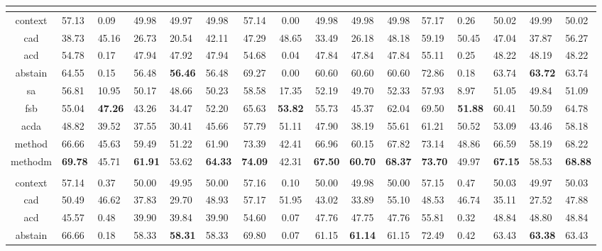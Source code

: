 \begin{table}[t!]
{\begin{tabular}{cgggggcccccggggg}
\midrule
 \\
\midrule
context & 57.13 & 0.09 & 49.98 & 49.97 & 49.98 & 57.14 & 0.00 & 49.98 & 49.98 & 49.98 & 57.17 & 0.26 & 50.02 & 49.99 & 50.02 \\
cad & 38.73 & 45.16 & 26.73 & 20.54 & 42.11 & 47.29 & 48.65 & 33.49 & 26.18 & 48.18 & 59.19 & 50.45 & 47.04 & 37.87 & 56.27 \\
acd & 54.78 & 0.17 & 47.94 & 47.92 & 47.94 & 54.68 & 0.04 & 47.84 & 47.84 & 47.84 & 55.11 & 0.25 & 48.22 & 48.19 & 48.22 \\
abstain & 64.55 & 0.15 & 56.48 & \textbf{56.46} & 56.48 & 69.27 & 0.00 & 60.60 & 60.60 & 60.60 & 72.86 & 0.18 & 63.74 & \textbf{63.72} & 63.74 \\
sa & 56.81 & 10.95 & 50.17 & 48.66 & 50.23 & 58.58 & 17.35 & 52.19 & 49.70 & 52.33 & 57.93 & 8.97 & 51.05 & 49.84 & 51.09 \\
fsb & 55.04 & \textbf{47.26} & 43.26 & 34.47 & 52.20 & 65.63 & \textbf{53.82} & 55.73 & 45.37 & 62.04 & 69.50 & \textbf{51.88} & 60.41 & 50.59 & 64.78 \\
acda & 48.82 & 39.52 & 37.55 & 30.41 & 45.66 & 57.79 & 51.11 & 47.90 & 38.19 & 55.61 & 61.21 & 50.52 & 53.09 & 43.46 & 58.18 \\
method & 66.66 & 45.63 & 59.49 & 51.22 & 61.90 & 73.39 & 42.41 & 66.96 & 60.15 & 67.82 & 73.14 & 48.86 & 66.59 & 58.19 & 68.22 \\
methodm & \textbf{69.78} & 45.71 & \textbf{61.91} & 53.62 & \textbf{64.33} & \textbf{74.09} & 42.31 & \textbf{67.50} & \textbf{60.70} & \textbf{68.37} & \textbf{73.70} & 49.97 & \textbf{67.15} & 58.53 & \textbf{68.88} \\
\midrule
 \\
\midrule
context & 57.14 & 0.37 & 50.00 & 49.95 & 50.00 & 57.16 & 0.10 & 50.00 & 49.98 & 50.00 & 57.15 & 0.47 & 50.03 & 49.97 & 50.03 \\
cad & 50.49 & 46.62 & 37.83 & 29.70 & 48.93 & 57.17 & 51.95 & 43.02 & 33.89 & 55.10 & 48.53 & 46.74 & 35.11 & 27.52 & 47.88 \\
acd & 45.57 & 0.48 & 39.90 & 39.84 & 39.90 & 54.60 & 0.07 & 47.76 & 47.75 & 47.76 & 55.81 & 0.32 & 48.84 & 48.80 & 48.84 \\
abstain & 66.66 & 0.18 & 58.33 & \textbf{58.31} & 58.33 & 69.80 & 0.07 & 61.15 & \textbf{61.14} & 61.15 & 72.49 & 0.42 & 63.43 & \textbf{63.38} & 63.43 \\

\end{tabular}}
\end{table}
